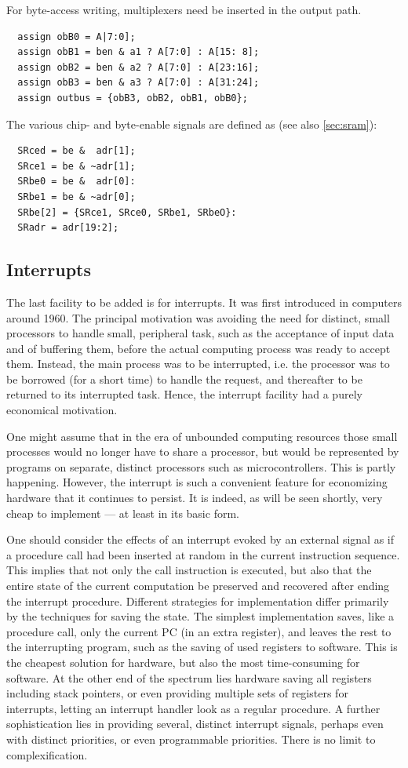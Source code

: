 For byte-access writing, multiplexers need be inserted in the output path.
\begin{verbatim}
  assign obB0 = A|7:0];
  assign obB1 = ben & a1 ? A[7:0] : A[15: 8];
  assign obB2 = ben & a2 ? A[7:0] : A[23:16];
  assign obB3 = ben & a3 ? A[7:0] : A[31:24];
  assign outbus = {obB3, obB2, obB1, obB0};
\end{verbatim}

The various chip- and byte-enable signals are defined as (see also \ref{sec:sram}):
\begin{verbatim}
  SRced = be &  adr[1];
  SRce1 = be & ~adr[1];
  SRbe0 = be &  adr[0]:
  SRbe1 = be & ~adr[0];
  SRbe[2] = {SRce1, SRce0, SRbe1, SRbeO}:
  SRadr = adr[19:2];
\end{verbatim}

\subsection{Interrupts}
The last facility to be added is for interrupts. It was first introduced in computers around 1960.
The principal motivation was avoiding the need for distinct, small processors to handle small,
peripheral task, such as the acceptance of input data and of buffering them, before the actual
computing process was ready to accept them. Instead, the main process was to be interrupted, i.e.
the processor was to be borrowed (for a short time) to handle the request, and thereafter to be
returned to its interrupted task. Hence, the interrupt facility had a purely economical motivation.

One might assume that in the era of unbounded computing resources those small processes would
no longer have to share a processor, but would be represented by programs on separate, distinct
processors such as microcontrollers. This is partly happening. However, the interrupt is such a
convenient feature for economizing hardware that it continues to persist. It is indeed, as will be
seen shortly, very cheap to implement — at least in its basic form.

One should consider the effects of an interrupt evoked by an external signal as if a procedure call
had been inserted at random in the current instruction sequence. This implies that not only the call
instruction is executed, but also that the entire state of the current computation be preserved and
recovered after ending the interrupt procedure. Different strategies for implementation differ
primarily by the techniques for saving the state. The simplest implementation saves, like a
procedure call, only the current PC (in an extra register), and leaves the rest to the interrupting
program, such as the saving of used registers to software. This is the cheapest solution for
hardware, but also the most time-consuming for software. At the other end of the spectrum lies
hardware saving all registers including stack pointers, or even providing multiple sets of registers
for interrupts, letting an interrupt handler look as a regular procedure. A further sophistication
lies in providing several, distinct interrupt signals, perhaps even with distinct priorities, or
even programmable priorities. There is no limit to complexification.

